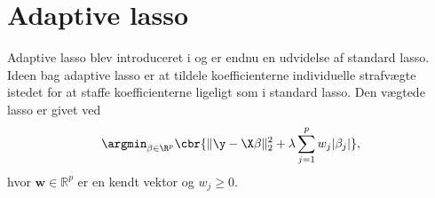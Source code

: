 %
%
\section{Adaptive lasso}
Adaptive lasso blev introduceret i \citep{adaptive_lasso} og er endnu en udvidelse af standard lasso.
Ideen bag adaptive lasso er at tildele koefficienterne individuelle strafvægte istedet for at staffe koefficienterne ligeligt som i standard lasso.
Den vægtede lasso er givet ved
\begin{align*}
\argmin_{\beta \in \R^p} \cbr{\Vert \y - \X \beta \Vert_2^2 + \lambda \sum_{j=1}^p w_j \vert \beta_j \vert},
\end{align*}
hvor \(\mathbf{w} \in \mathbb{R}^p\) er en kendt vektor og \(w_j \geq 0\).

